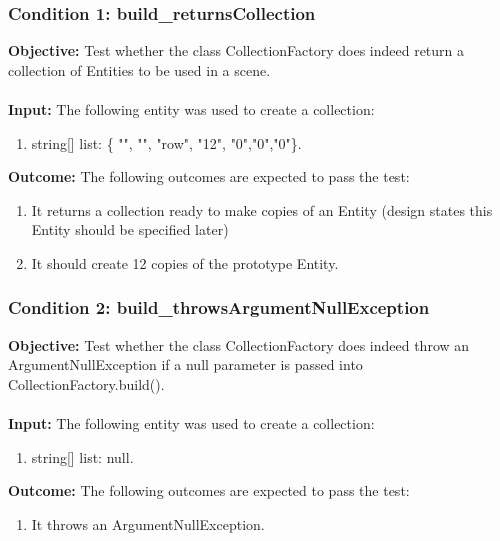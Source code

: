 \documentclass[a4paper,12pt]{article}
\begin{document}
		\subsubsection{Condition 1: build\_returnsCollection}
			\textbf{Objective:} Test whether the class CollectionFactory does indeed return a collection of Entities to be used in a scene.\\\\
			\textbf{Input:} The following entity was used to create a collection:
				\begin{enumerate}
					\item string[] list: \{ "", "", "row", "12", "0","0","0"\}.
				\end{enumerate}
			\textbf{Outcome:} The following outcomes are expected to pass the test:
				\begin{enumerate}
					\item It returns a collection ready to make copies of an Entity (design states this Entity should be specified later)
					\item It should create 12 copies of the prototype Entity.
				\end{enumerate}
		\subsubsection{Condition 2: build\_throwsArgumentNullException}
			\textbf{Objective:} Test whether the class CollectionFactory does indeed throw an ArgumentNullException if a null parameter is passed into CollectionFactory.build().\\\\
			\textbf{Input:} The following entity was used to create a collection:
				\begin{enumerate}
					\item string[] list: null.
				\end{enumerate}
			\textbf{Outcome:} The following outcomes are expected to pass the test:
				\begin{enumerate}
					\item It throws an ArgumentNullException.
				\end{enumerate}
\end{document}
